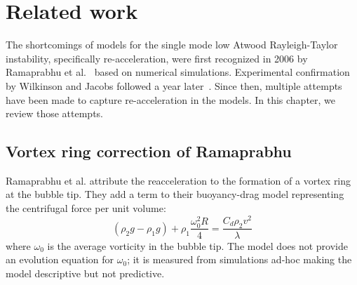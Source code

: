 \chapter{Related work}

The shortcomings of models for the single mode low Atwood Rayleigh-Taylor instability, specifically re-acceleration, were first recognized in 2006 by Ramaprabhu et al.~\cite{Ramaprabhu2006} based on numerical simulations.
Experimental confirmation by Wilkinson and Jacobs followed a year later~\cite{Wilkinson2007}.
Since then, multiple attempts have been made to capture re-acceleration in the models.
In this chapter, we review those attempts.

\section{Vortex ring correction of Ramaprabhu}

Ramaprabhu et al. attribute the reacceleration to the formation of a vortex ring at the bubble tip.
They add a term to their buoyancy-drag model representing the centrifugal force per unit volume:
\begin{equation}
\left(\rho_2 g - \rho_1 g\right) + \rho_1 \frac{\omega_0^2 R}{ 4} = \frac{C_d \rho_2 v^2}{\lambda}
\end{equation}
where $\omega_0$ is the average vorticity in the bubble tip.
The model does not provide an evolution equation for $\omega_0$; it is measured from simulations ad-hoc making the model descriptive but not predictive.

